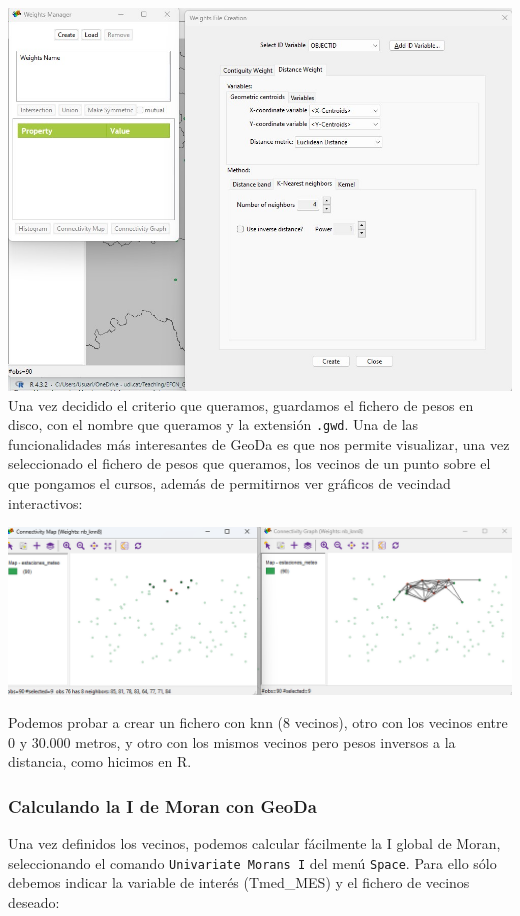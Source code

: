 \documentclass[
  letterpaper,
  DIV=11,
  numbers=noendperiod]{scrreprt}
\begin{document}
\includegraphics{images/geoda_weights.jpg} Una vez decidido el criterio
que queramos, guardamos el fichero de pesos en disco, con el nombre que
queramos y la extensión \texttt{.gwd}. Una de las funcionalidades más
interesantes de GeoDa es que nos permite visualizar, una vez
seleccionado el fichero de pesos que queramos, los vecinos de un punto
sobre el que pongamos el cursos, además de permitirnos ver gráficos de
vecindad interactivos:

\includegraphics{images/geoda_weights_interactivo.png}

Podemos probar a crear un fichero con knn (8 vecinos), otro con los
vecinos entre 0 y 30.000 metros, y otro con los mismos vecinos pero
pesos inversos a la distancia, como hicimos en R.

\hypertarget{calculando-la-i-de-moran-con-geoda}{%
\subsubsection{Calculando la I de Moran con
GeoDa}\label{calculando-la-i-de-moran-con-geoda}}

Una vez definidos los vecinos, podemos calcular fácilmente la I global
de Moran, seleccionando el comando
\texttt{Univariate\ Moran\textquotesingle{}s\ I} del menú
\texttt{Space}. Para ello sólo debemos indicar la variable de interés
(Tmed\_MES) y el fichero de vecinos deseado:
\end{document}
